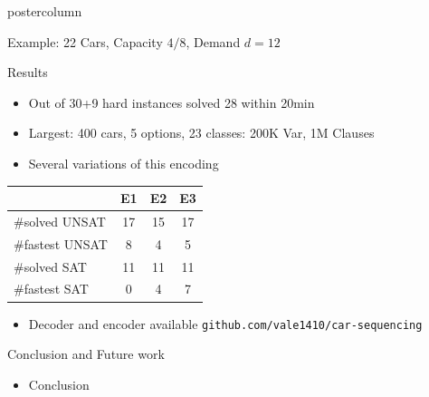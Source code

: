 \documentclass[final]{beamer}
\begin{document}
\begin{frame}
\begin{columns}
\begin{column}{.49\textwidth}
\begin{beamercolorbox}[center,wd=\textwidth]{postercolumn}
\begin{minipage}[T]{.95\textwidth}
{\begin{block}{Example: 22 Cars, Capacity $4/8$, Demand $d=12$}
                
            \end{block}
            \vfill
            \begin{block}{Results}
                \begin{itemize}
                \itemsep1pt\parskip0pt
                \item
                    Out of 30+9 hard instances solved 28 within 20min
                    \cite{Gravel05}
                \item
                  Largest: 400 cars, 5 options, 23 classes: 200K Var, 1M Clauses
                \item
                  Several variations of this encoding
                \end{itemize}
                
                \begin{center}
                \begin{tabular}{ l|ccc}
                    &E1 &E2 &E3 \\
                \hline
                \#solved UNSAT  & 17    &15 & 17 \\
                \#fastest UNSAT & 8 &4  & 5 \\
                \#solved SAT    & 11    & 11    & 11  \\
                \#fastest SAT   & 0 &4  & 7  \\
                \hline
                \end{tabular}
                \end{center}

                \begin{itemize}
                \itemsep1pt\parskip0pt
                \item Decoder and encoder available \texttt{github.com/vale1410/car-sequencing}
                \end{itemize}
            \end{block}
            \vfill
            \begin{block}{Conclusion and Future work}
                \begin{itemize}
                    \item Conclusion


\end{itemize}
\end{block}}
\end{minipage}
\end{beamercolorbox}
\end{column}
\end{columns}
\end{frame}
\end{document}
